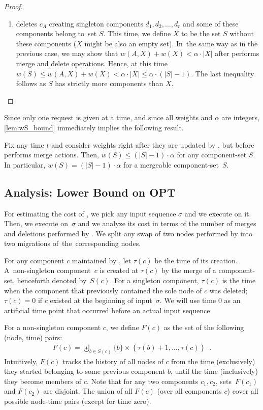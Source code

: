 \begin{proof}
\begin{enumerate}
\item \CREP deletes $c_A$ creating singleton components $d_1, d_2, \ldots, d_r$ 
and some of these components belong to~set $S$. This time, we define $X$ to be
the set $S$ without these components ($X$ might be also an empty set). In~the
same way as in the previous case, we may show that $w(A,X) + w(X) < \alpha
\cdot |X|$ after \CREP performs merge and delete operations. Hence, at this
time $w(S) \leq w(A,X) + w(X) < \alpha \cdot |X| \leq \alpha \cdot (|S|-1)$.
The last inequality follows as $S$ has strictly more components than $X$.

\end{enumerate}
\end{proof}

Since only one request is given at a time, and since all weights and $\alpha$
are integers, \ref{lem:wS_bound} immediately implies the following
result.

\begin{corollary}
\label{cor:mergeable_sets} Fix any time $t$ and consider weights right after
they are updated by \CREP, but before \CREP performs merge actions. Then,
$w(S) \leq (|S|-1) \cdot \alpha$ for any component-set $S$. In particular,
$w(S) = (|S|-1) \cdot \alpha$ for a mergeable component-set~$S$.
\end{corollary}



\subsection{Analysis: Lower Bound on OPT}

For estimating the cost of \OPT, we pick any input sequence $\sigma$ and we
execute \CREP on it. Then, we execute \OPT on~$\sigma$ and we analyze its cost
in terms of the number of merges and deletions performed by \CREP. We split
any swap of two nodes performed by \OPT into two migrations of~the~corresponding nodes.

For any component $c$ maintained by \CREP, let $\tau(c)$ be the time of its
creation. A~non-singleton component~$c$ is created at $\tau(c)$ by the merge
of a component-set, henceforth denoted by~$S(c)$. For a singleton component,
$\tau(c)$ is the time when the component that previously contained the sole
node of $c$ was deleted; $\tau(c) = 0$ if $c$ existed at the beginning of
input~$\sigma$. We will use time $0$ as an artificial time point that occurred
before an actual input sequence.

For a non-singleton component $c$, we 
define $F(c)$ as the set of the following (node, time) pairs:
\begin{align*}
	F(c) = \biguplus_{b \in S(c)} \{ b \}  \times \left\{ \tau(b)+1, \ldots, \tau(c) \right\}
	\enspace.
\end{align*}
Intuitively, $F(c)$ tracks the history of all nodes of $c$ from the time 
(exclusively) they started belonging to some previous component $b$, until the time 
(inclusively) they become members of $c$. Note that for any two components 
$c_1,c_2$, sets~$F(c_1)$ and $F(c_2)$ are disjoint.
The union of all $F(c)$ (over all components $c$) 
cover all possible node-time pairs (except for time zero). 


